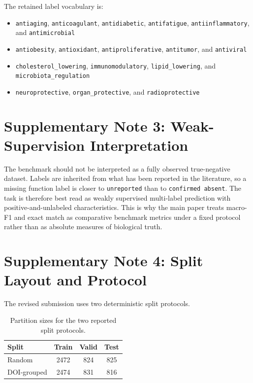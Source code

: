 \documentclass{article}
\begin{document}
The retained label vocabulary is:
\begin{itemize}
\item \texttt{antiaging}, \texttt{anticoagulant}, \texttt{antidiabetic}, \texttt{antifatigue}, \texttt{antiinflammatory}, and \texttt{antimicrobial}
\item \texttt{antiobesity}, \texttt{antioxidant}, \texttt{antiproliferative}, \texttt{antitumor}, and \texttt{antiviral}
\item \texttt{cholesterol\_lowering}, \texttt{immunomodulatory}, \texttt{lipid\_lowering}, and \texttt{microbiota\_regulation}
\item \texttt{neuroprotective}, \texttt{organ\_protective}, and \texttt{radioprotective}
\end{itemize}

\section{Supplementary Note 3: Weak-Supervision Interpretation}

The benchmark should not be interpreted as a fully observed true-negative dataset. Labels are inherited from what has been reported in the literature, so a missing function label is closer to \texttt{unreported} than to \texttt{confirmed absent}. The task is therefore best read as weakly supervised multi-label prediction with positive-and-unlabeled characteristics. This is why the main paper treats macro-F1 and exact match as comparative benchmark metrics under a fixed protocol rather than as absolute measures of biological truth.

\section{Supplementary Note 4: Split Layout and Protocol}

The revised submission uses two deterministic split protocols.

\begin{table}[h]
\centering
\caption{Partition sizes for the two reported split protocols.}
\begin{tabular}{lccc}
\toprule
Split & Train & Valid & Test \\
\midrule
Random & 2472 & 824 & 825 \\
DOI-grouped & 2474 & 831 & 816 \\
\bottomrule
\end{tabular}
\end{table}
\end{document}
